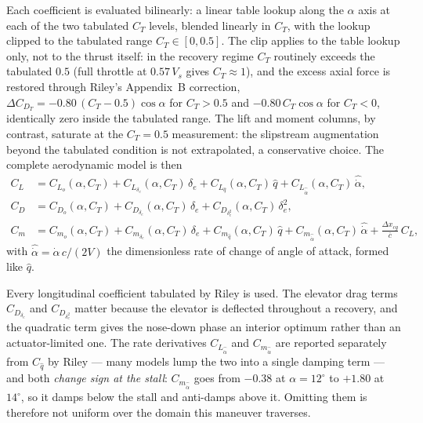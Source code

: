 \documentclass[journal ]{new-aiaa}
\begin{document}
Each coefficient is evaluated bilinearly: a linear table lookup
along the $\alpha$ axis at each of the two tabulated $C_T$ levels,
blended linearly in $C_T$, with the lookup clipped to the tabulated
range $C_T \in [0, 0.5]$. The clip applies to the table lookup only,
not to the thrust itself: in the recovery regime $C_T$ routinely
exceeds the tabulated $0.5$ (full throttle at $0.57\,V_s$ gives
$C_T \approx 1$), and the excess axial force is restored through
Riley's Appendix~B correction,
$\Delta C_{D_T} = -0.80\,(C_T - 0.5)\cos\alpha$ for $C_T > 0.5$ and
$-0.80\,C_T\cos\alpha$ for $C_T < 0$, identically zero inside the
tabulated range. The lift and moment columns, by contrast, saturate
at the $C_T = 0.5$ measurement: the slipstream augmentation beyond
the tabulated condition is not extrapolated, a conservative choice.
The complete aerodynamic model is then
\begin{align}
    C_L &= C_{L_o}(\alpha, C_T)
         + C_{L_{\delta_e}}(\alpha, C_T)\,\delta_e
         + C_{L_{\hat{q}}}(\alpha, C_T)\,\hat{q}
         + C_{L_{\hat{\dot{\alpha}}}}(\alpha, C_T)\,\hat{\dot{\alpha}},
    \label{eq:cl_riley}\\
    C_D &= C_{D_o}(\alpha, C_T)
         + C_{D_{\delta_e}}(\alpha, C_T)\,\delta_e
         + C_{D_{\delta_e^2}}(\alpha, C_T)\,\delta_e^2,
    \label{eq:cd_riley}\\
    C_m &= C_{m_o}(\alpha, C_T)
         + C_{m_{\delta_e}}(\alpha, C_T)\,\delta_e
         + C_{m_{\hat{q}}}(\alpha, C_T)\,\hat{q}
         + C_{m_{\hat{\dot{\alpha}}}}(\alpha, C_T)\,\hat{\dot{\alpha}}
         + \frac{\Delta x_{cg}}{\bar{c}}\, C_L,
    \label{eq:cm_riley}
\end{align}
with $\hat{\dot{\alpha}} = \dot{\alpha}\,c/(2V)$ the dimensionless rate
of change of angle of attack, formed like $\hat{q}$.

Every longitudinal coefficient tabulated by Riley is used. The elevator
drag terms $C_{D_{\delta_e}}$ and $C_{D_{\delta_e^2}}$ matter because the
elevator is deflected throughout a recovery, and the quadratic term
gives the nose-down phase an interior optimum rather than an
actuator-limited one. The rate derivatives
$C_{L_{\hat{\dot{\alpha}}}}$ and $C_{m_{\hat{\dot{\alpha}}}}$ are
reported separately from $C_{\hat{q}}$ by Riley --- many models lump the
two into a single damping term --- and both \emph{change sign at the
stall}: $C_{m_{\hat{\dot{\alpha}}}}$ goes from $-0.38$ at
$\alpha = 12^\circ$ to $+1.80$ at $14^\circ$, so it damps below the
stall and anti-damps above it. Omitting them is therefore not uniform
over the domain this maneuver traverses.
\end{document}
